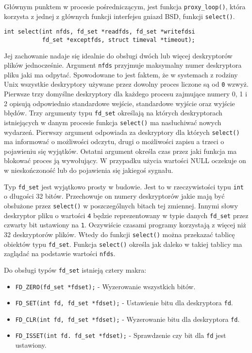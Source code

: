 \documentclass[10pt]{article}
\begin{document}
Głównym punktem w procesie pośredniczącym, jest funkcja \texttt{proxy\_loop()}, która korzysta z jednej z głównych funkcji interfejsu gniazd BSD, funkcji \texttt{select()}.

\begin{verbatim}
int select(int nfds, fd_set *readfds, fd_set *writefdsi
           fd_set *exceptfds, struct timeval *timeout);
\end{verbatim}

Jej zachowanie nadaje się idealnie do obsługi dwóch lub więcej deskryptorów plików jednocześnie. Argument \texttt{nfds} przyjmuje maksymalny numer deskryptora pliku jaki ma odpytać. Spowodowane to jest faktem, że w systemach z rodziny Unix wszystkie deskryptory używane przez dowolny proces liczone są od \texttt{0} wzwyż. Pierwsze trzy domyślne deskryptory dla każdego procesu zajmujące numery 0, 1 i 2 opisują odpowiednio standardowe wejście, standardowe wyjście oraz wyjście błędów. Trzy argumenty typu \texttt{fd\_set} określają na których deskryptorach istniejących w danym procesie funkcja \texttt{select()} ma nasłuchiwać nowych wydarzeń. Pierwszy argument odpowiada za deskryptory dla których \texttt{select()} ma informować o możliwości odczytu, drugi o możliwości zapisu a trzeci o pojawieniu się wyjątków. Ostatni argument określa czas przez jaki funkcja ma blokować proces ją wywołujący. W przypadku użycia wartości NULL oczekuje on w nieskończoność lub do pojawienia się jakiegoś sygnału.

Typ \texttt{fd\_set} jest wyjątkowo prosty w budowie. Jest to w rzeczywistości typu \texttt{int} o długości 32 bitów. Przechowuje on numery deskryptorów jakie mają być obsłużone przez \texttt{select()} w poszczególnych bitach tej zmiennej. Innymi słowy deskryptor pliku o wartości \texttt{4} będzie reprezentowany w typie danych \texttt{fd\_set} przez czwarty bit ustawiony na \texttt{1}. Oczywiście czasami programy korzystają z więcej niż 32 deskryptorów plików. Wtedy do funkcji \texttt{select()} można przekazać tablicę obiektów typu \texttt{fd\_set}. Funkcja \texttt{select()} określa jak daleko w takiej tablicy ma zaglądać na podstawie wartości \texttt{nfds}.

Do obsługi typów \texttt{fd\_set} istnieją cztery makra:

\begin{itemize}
\itemsep1pt\parskip0pt
\item
  \texttt{FD\_ZERO(fd\_set *fdset);} - Wyzerowanie wszystkich bitów.
\item
  \texttt{FD\_SET(int fd, fd\_set *fdset);} - Ustawienie bitu dla
  deskryptora \texttt{fd}.
\item
  \texttt{FD\_CLR(int fd, fd\_set *fdset);} - Wyzerowanie bitu dla
  deskryptora \texttt{fd}.
\item
  \texttt{FD\_ISSET(int fd. fd\_set *fdset);} - Sprawdzenie czy bit dla
  \texttt{fd} jest ustawiony.
\end{itemize}
\end{document}
